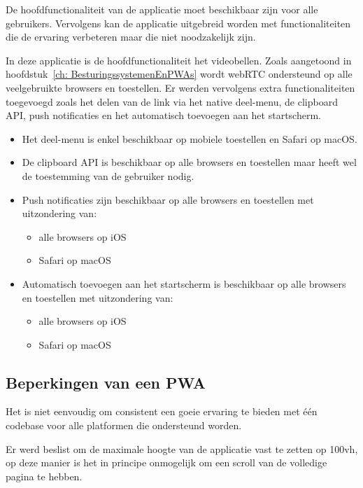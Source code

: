 		De hoofdfunctionaliteit van de applicatie moet beschikbaar zijn voor alle gebruikers. Vervolgens kan de applicatie uitgebreid worden met functionaliteiten die de ervaring verbeteren maar die niet noodzakelijk zijn.
		
		In deze applicatie is de hoofdfunctionaliteit het videobellen. Zoals aangetoond in hoofdstuk~\ref{ch: BesturingssystemenEnPWAs} wordt webRTC ondersteund op alle veelgebruikte browsers en toestellen.  Er werden vervolgens extra functionaliteiten toegevoegd zoals het delen van de link via het native deel-menu, de clipboard API, push notificaties en het automatisch toevoegen aan het startscherm.
		\begin{itemize}
	  		\item Het deel-menu is enkel beschikbaar op mobiele toestellen en Safari op macOS.
	  		\item De clipboard API is beschikbaar op alle browsers en toestellen maar heeft wel de toestemming van de gebruiker nodig.
	  		\item Push notificaties zijn beschikbaar op alle browsers en toestellen met uitzondering van:
	  				\begin{itemize}
	  			  		\item alle browsers op iOS
	  			  		\item Safari op macOS
	  		 		\end{itemize}	
  			\item Automatisch toevoegen aan het startscherm is beschikbaar op alle browsers en toestellen met uitzondering van:
	  				\begin{itemize}
	  			  		\item alle browsers op iOS
	  			  		\item Safari op macOS
	  		 		\end{itemize}	
 		\end{itemize}
 		
 	
 	\subsection{Beperkingen van een PWA}
 			
			Het is niet eenvoudig om consistent een goeie ervaring te bieden met één codebase voor alle platformen die ondersteund worden. 
			
			Er werd beslist om de maximale hoogte van de applicatie vast te zetten op 100vh,  op deze manier is het in principe onmogelijk om een scroll van de volledige pagina te hebben. 
			
